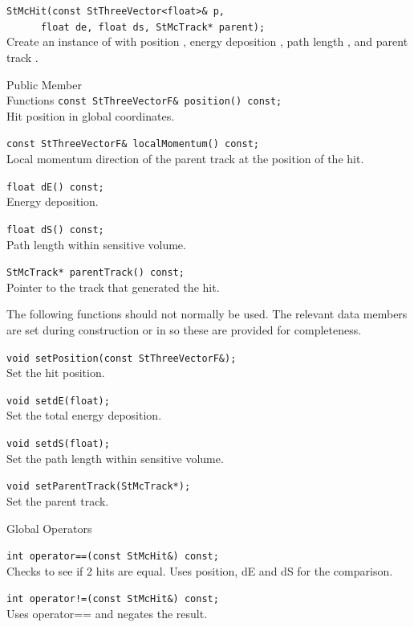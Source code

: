 \begin{Entry}
    \verb+StMcHit(const StThreeVector<float>& p,+\\
    \verb+      float de, float ds, StMcTrack* parent);+\\
    
    Create an instance of  with position ,
    energy deposition , path length , and parent track .

\item[Public Member\\ Functions]
    \verb+const StThreeVectorF& position() const;+\\
    Hit position in global coordinates.

    \verb+const StThreeVectorF& localMomentum() const;+\\
    Local momentum direction of the parent track at the position of the hit.

    \verb+float dE() const;+\\
    Energy deposition.

    \verb+float dS() const;+\\
    Path length within sensitive volume.

    \verb+StMcTrack* parentTrack() const;+\\
    Pointer to the track that generated the hit.

    The following functions should not normally be used.
    The relevant data members are set during construction or
    in  so these are provided for completeness.

    \verb+void setPosition(const StThreeVectorF&);+\\
    Set the hit position.

    \verb+void setdE(float);+\\
    Set the total energy deposition.

    \verb+void setdS(float);+\\
    Set the path length within sensitive volume.

    \verb+void setParentTrack(StMcTrack*);+\\
    Set the parent track.
    
\item[Global Operators]

    \verb+int operator==(const StMcHit&) const;+\\
    Checks to see if 2 hits are equal.  Uses position, dE and dS
    for the comparison.

    \verb+int operator!=(const StMcHit&) const;+\\
    Uses operator== and negates the result.


\end{Entry}
